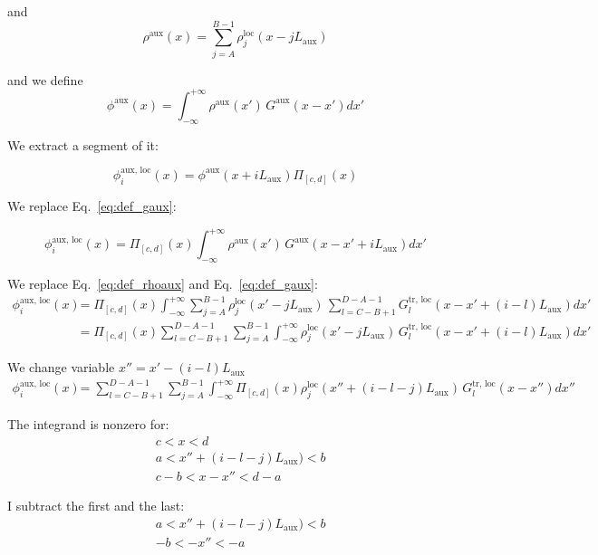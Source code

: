 and 
\begin{equation}
\rho^\text{aux}(x)= 
\sum_{j=A}^{B-1} \rho_{j}^\text{loc}(x - jL_\text{aux})
\label{eq:def_rhoaux}
\end{equation}

and we define 
\begin{equation}
\phi^\text{aux}(x)= 
\int_{-\infty}^{+\infty}
\rho^\text{aux}(x')\,G^\text{aux}(x-x') dx'
\label{eq:def_phiaux}
\end{equation}

We extract a segment of it:


\begin{equation}
\phi^\text{aux, loc}_i(x)= 
\phi^\text{aux}(x + iL_\text{aux}) 
\Pi_{[c, d]}(x)
\label{eq:def_phiauxloc}
\end{equation}

We replace Eq.~\ref{eq:def_gaux}:

\begin{equation}
\phi^\text{aux, loc}_i(x)= 
\Pi_{[c, d]}(x)
\int_{-\infty}^{+\infty}
\rho^\text{aux}(x')\,G^\text{aux}(x-x'+iL_\text{aux}) dx'
\end{equation}

We replace Eq.~\ref{eq:def_rhoaux} and Eq.~\ref{eq:def_gaux}:
\begin{align}
\phi^\text{aux, loc}_i(x)&= 
\Pi_{[c, d]}(x)
\int_{-\infty}^{+\infty}
\sum_{j=A}^{B-1} \rho_{j}^\text{loc}(x' - jL_\text{aux})\,
\sum_{l=C-B+1}^{D-A-1}
G^\text{tr, loc}_{l}(x-x'+(i-l)L_\text{aux})
dx'\\
&=
\Pi_{[c, d]}(x)
\sum_{l=C-B+1}^{D-A-1} \sum_{j=A}^{B-1} \int_{-\infty}^{+\infty}\rho_{j}^\text{loc}(x' - jL_\text{aux})\,
G^\text{tr, loc}_{l}(x-x'+(i-l)L_\text{aux})
dx'
\end{align}

We change variable $x''= x' - (i-l)L_\text{aux}$
\begin{align}
\phi^\text{aux, loc}_i(x)
&=
\sum_{l=C-B+1}^{D-A-1} \sum_{j=A}^{B-1} \int_{-\infty}^{+\infty}
\Pi_{[c, d]}(x)
\rho_{j}^\text{loc}(x'' + (i-l -j)L_\text{aux})\,
G^\text{tr, loc}_{l}(x-x'')
dx''
\end{align}

The integrand is nonzero for:
\begin{align}
& c < x <d\\
& a < x'' +(i-l-j)L_\text{aux}) < b\\
& c-b < x-x''< d-a
\end{align}

I subtract the first and the last:
\begin{align}
& a < x'' +(i-l-j)L_\text{aux}) < b\\
& -b < -x''< -a
\end{align}

